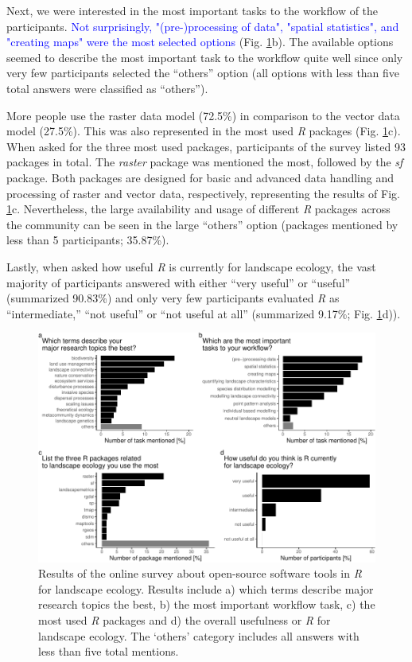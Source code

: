\documentclass[smallextended]{svjour3}       %
\begin{document}
Next, we were interested in the most important tasks to the workflow of the participants.
\textcolor{blue}{Not surprisingly, "(pre-)processing of data", "spatial statistics", and "creating maps" were the most selected options} (Fig. \ref{fig:fig-survey}b).
The available options seemed to describe the most important task to the workflow quite well since only very few participants selected the ``others'' option (all options with less than five total answers were classified as ``others'').

More people use the raster data model (72.5\%) in comparison to the vector data model (27.5\%).
This was also represented in the most used \textit{R} packages (Fig. \ref{fig:fig-survey}c).
When asked for the three most used packages, participants of the survey listed 93 packages in total.
The \textit{raster} package was mentioned the most, followed by the \textit{sf} package.
Both packages are designed for basic and advanced data handling and processing of raster and vector data, respectively, representing the results of Fig. \ref{fig:fig-survey}c.
Nevertheless, the large availability and usage of different \textit{R} packages across the community can be seen in the large ``others'' option (packages mentioned by less than 5 participants; 35.87\%).

Lastly, when asked how useful \textit{R} is currently for landscape ecology, the vast majority of participants answered with either ``very useful'' or ``useful'' (summarized 90.83\%) and only very few participants evaluated \textit{R} as ``intermediate,'' ``not useful'' or ``not useful at all'' (summarized 9.17\%; Fig. \ref{fig:fig-survey}d)).



\begin{figure}

{\centering \includegraphics[width=\textwidth]{paper_files/figure-latex/fig-survey-1} 

}

\caption{Results of the online survey about open-source software tools in \textit{R} for landscape ecology. Results include a) which terms describe major research topics the best, b) the most important workflow task, c) the most used \textit{R} packages and d) the overall usefulness or \textit{R} for landscape ecology. The `others' category includes all answers with less than five total mentions.}\label{fig:fig-survey}
\end{figure}
\end{document}
